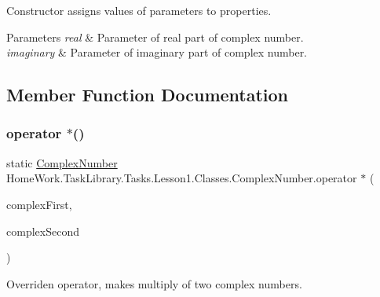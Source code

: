 Constructor assigns values of parameters to properties. 


\begin{DoxyParams}{Parameters}
{\em real} & Parameter of real part of complex number.\\
\hline
{\em imaginary} & Parameter of imaginary part of complex number.\\
\hline
\end{DoxyParams}


\subsection{Member Function Documentation}
\mbox{\label{class_home_work_1_1_task_library_1_1_tasks_1_1_lesson1_1_1_classes_1_1_complex_number_ae693b757b343c8c6a8d3cc1f11619aca}} 
\subsubsection{\texorpdfstring{operator $\ast$()}{operator *()}}
{\footnotesize\ttfamily static \mbox{\hyperlink{class_home_work_1_1_task_library_1_1_tasks_1_1_lesson1_1_1_classes_1_1_complex_number}{Complex\+Number}} Home\+Work.\+Task\+Library.\+Tasks.\+Lesson1.\+Classes.\+Complex\+Number.\+operator $\ast$ (\begin{DoxyParamCaption}\item[{\mbox{\hyperlink{class_home_work_1_1_task_library_1_1_tasks_1_1_lesson1_1_1_classes_1_1_complex_number}{Complex\+Number}}}]{complex\+First,  }\item[{\mbox{\hyperlink{class_home_work_1_1_task_library_1_1_tasks_1_1_lesson1_1_1_classes_1_1_complex_number}{Complex\+Number}}}]{complex\+Second }\end{DoxyParamCaption})\hspace{0.3cm}{\ttfamily [static]}}



Overriden operator, makes multiply of two complex numbers. 


